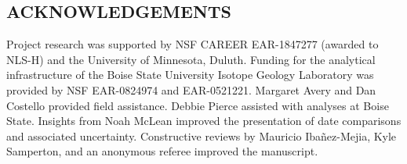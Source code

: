 \documentclass[11pt,letterpaper]{article}
\begin{document}


\subsection*{ACKNOWLEDGEMENTS}
Project research was supported by NSF CAREER EAR-1847277 (awarded to NLS-H) and the University of Minnesota, Duluth. Funding for the analytical infrastructure of the Boise State University Isotope Geology Laboratory was provided by NSF EAR-0824974 and EAR-0521221. Margaret Avery and Dan Costello provided field assistance. Debbie Pierce assisted with analyses at Boise State. Insights from Noah McLean improved the presentation of date comparisons and associated uncertainty. Constructive reviews by Mauricio Iba\~nez-Mejia, Kyle Samperton, and an anonymous referee improved the manuscript.
\footnotesize

\singlespacing




\newpage






\end{document}
